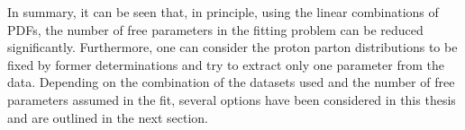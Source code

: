 In summary, it can be seen that, in principle, using the linear combinations of PDFs, the number of free parameters in the fitting problem can be reduced significantly. Furthermore, one can consider the proton parton distributions to be fixed by former determinations and try to extract only one parameter \asz from the data. Depending on the combination of the datasets used and the number of free parameters assumed in the fit, several options have been considered in this thesis and are outlined in the next section.
